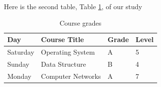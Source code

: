 Here is the second table, Table \ref{Tab3}, of our study
 
\begin{table}[h]
\caption{Course grades}
\begin{center}
\begin{tabular}{llll}
\hline
Day      & Course Title      & Grade & Level \\ \hline
Saturday & Operating System  & A     & 5     \\ \hline
Sunday   & Data Structure    & B     & 4     \\ \hline
Monday   & Computer Networks & A     & 7     \\ \hline
\end{tabular}
\end{center}
\label{Tab3}
\end{table}

